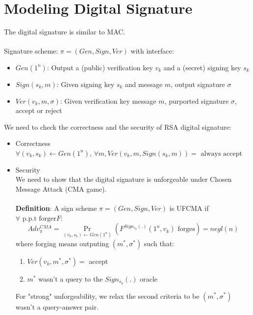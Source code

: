 \documentclass{scribe}
\begin{document}
\section{Modeling Digital Signature}
The digital signature is similar to MAC.
\\\\
Signature scheme: $\pi = (Gen, Sign, Ver)$ with interface:
\begin{itemize}
    \item $Gen(1^n)$: Output a (public) verification key $v_k$ and a (secret) signing key $s_k$
    \item $Sign(s_k,m)$: Given signing key $s_k$ and message $m$, output signature $\sigma$
    \item $Ver(v_k,m,\sigma)$: Given verification key message $m$,  purported signature $\sigma$, accept or reject
\end{itemize}
\vspace{5mm}
We need to check the correctness and the security of RSA digital signature:
\begin{itemize}
    \item Correctness\\
            $\forall (v_k,s_k) \leftarrow Gen(1^n)$, $\forall m, Ver(v_k,m,Sign(s_k,m))=\text{ always accept}$
    \item Security\\
            We need to show that the digital signature is unforgeable under Chosen Message Attack (CMA game).\\\\
            \textbf{Definition}: A sign scheme $\pi = (Gen,Sign,Ver)$ is UFCMA if $\forall \text{ p.p.t forger} F$:
            \[Adv_{\pi}^{CMA} = \Pr_{(v_k,s_k) \leftarrow Gen(1^n)}(F^{Sign_{s_k}(.)}(1^n,v_k) \text{ forges}) = negl(n) \]
            where forging means outputing $(m^*,\sigma^*)$ such that:
            \begin{enumerate}
                \item $Ver(v_k,m^*,\sigma^*) = $ accept
                \item $m^*$ wasn't a query to the $Sign_{s_k}(.)$ oracle
            \end{enumerate}
            For "strong" unforgeability, we relax the second criteria to be $(m^*,\sigma^*)$ wasn't a query-answer pair.  
\end{itemize}

\vspace{10mm}
\end{document}
